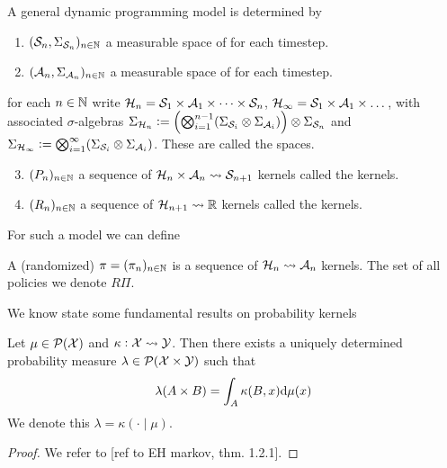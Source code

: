 \documentclass{article}
\begin{document}
\begin{defn}
  A general dynamic programming model is determined by
  \begin{enumerate}
    \item $(\mathcal{S}_n, \Sigma_{\mathcal{S}_n})_{n \in \mathbb{N}}$ a 
      measurable space of  for each timestep.
    \item $(\mathcal{A}_n, \Sigma_{\mathcal{A}_n})_{n \in \mathbb{N}}$ a 
      measurable space of  for each timestep.
  \end{enumerate}
  for each $n \in \mathbb{N}$ write $\mathcal{H}_n = \mathcal{S}_1 \times \mathcal{A}_1
  \times \dots \times \mathcal{S}_n$, $\mathcal{H}_\infty = \mathcal{S}_1
  \times \mathcal{A}_1 \times \dots$,
  with associated $\sigma$-algebras $ \Sigma_{\mathcal{H}_n} \vcentcolon= \left(
    \bigotimes_{i=1}^{n-1} (\Sigma_{\mathcal{S}_i} \otimes \Sigma_{\mathcal{A}_i})
  \right) \otimes \Sigma_{\mathcal{S}_n}$ and
  $\Sigma_{\mathcal{H}_\infty} \vcentcolon= 
  \bigotimes_{i=1}^{\infty} (\Sigma_{\mathcal{S}_i} \otimes \Sigma_{\mathcal{A}_i})$.
  These are called the  spaces.
  \begin{enumerate} \setcounter{enumi}{2}
    \item $(P_n)_{n \in \mathbb{N}}$ a sequence of
      $\mathcal{H}_n \times \mathcal{A}_n \leadsto \mathcal{S}_{n+1}$ kernels
      called the  kernels.
    \item $(R_n)_{n \in \mathbb{N}}$ a sequence of
      $\mathcal{H}_{n+1} \leadsto \mathbb{R}$ kernels
      called the  kernels.
  \end{enumerate}
\end{defn}

For such a model we can define
\begin{defn}[Policy]
  A (randomized)  $\pi = (\pi_n)_{n \in \mathbb{N}}$
  is a sequence of $\mathcal{H}_n \leadsto \mathcal{A}_n$ kernels.
  The set of all policies we denote $R\Pi$.
\end{defn}

We know state some fundamental results on probability kernels

\begin{thm}
  Let $\mu \in \mathcal{P}(\mathcal{X})$ and $\kappa : \mathcal{X} \leadsto \mathcal{Y}$.
  Then there exists a uniquely determined probability measure
  $\lambda \in \mathcal{P}(\mathcal{X} \times \mathcal{Y})$
  such that
  \[ \lambda(A \times B) = \int_A \kappa(B, x) \mathrm{d} \mu(x) \]
  We denote this $\lambda = \kappa(\cdot \mid \mu)$.
  \label{thm:intKer}
\end{thm}
\begin{proof}
  We refer to [ref to EH markov, thm. 1.2.1].
\end{proof}
\end{document}
